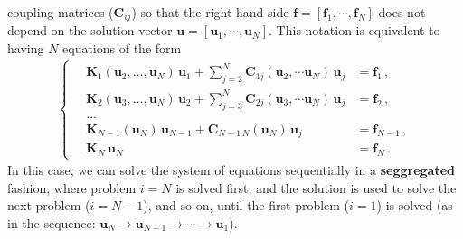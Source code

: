coupling matrices ($\mathbf{C}_{ij}$) so that the right-hand-side $\mathbf{f}=[\mathbf{f}_1, \cdots, \mathbf{f}_N]$ does not depend
on the solution vector $\mathbf{u}=[\mathbf{u}_1, \cdots, \mathbf{u}_N]$. This notation is equivalent to having $N$ equations of the form
\begin{align}
\left\{
    \begin{aligned}
        \quad \mathbf{K}_1(\mathbf{u}_2, \ldots, \mathbf{u}_N)\, \mathbf{u}_1  + \sum_{j=2}^N \mathbf{C}_{1j} (\mathbf{u}_2, \cdots \mathbf{u}_N)\, \mathbf{u}_j &= \mathbf{f}_1\,, \\
        \quad\mathbf{K}_2(\mathbf{u}_3, \ldots, \mathbf{u}_N)\, \mathbf{u}_2 + \sum_{j=3}^N \mathbf{C}_{2j} (\mathbf{u}_3, \cdots \mathbf{u}_N)\, \mathbf{u}_j &= \mathbf{f}_2\,, \\
        \quad\ldots \\
        \quad\mathbf{K}_{N-1} (\mathbf{u}_N) \, \mathbf{u}_{N-1} + \mathbf{C}_{N-1\, N}(\mathbf{u}_N)\, \mathbf{u}_j &= \mathbf{f}_{N-1} \,, \\
        \quad\mathbf{K}_N \, \mathbf{u}_N &= \mathbf{f}_N\,.
    \end{aligned}
\right.
\end{align}
In this case, we can solve the system of equations sequentially in a \textbf{seggregated} fashion,
 where problem $i=N$ is solved first, and the solution is used to solve the next problem ($i=N-1$), and so on, until the first problem ($i=1$) is solved
 (as in the sequence: $\mathbf{u}_N \to \mathbf{u}_{N-1} \to \cdots \to \mathbf{u}_1$).\\

